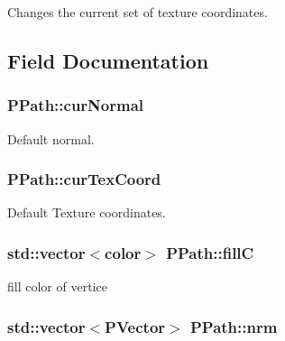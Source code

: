\-Changes the current set of texture coordinates. 



\subsection{\-Field \-Documentation}
\hypertarget{structPPath_ad6cdebaac653dd51a50cde8ef566a42c}{
\subsubsection[{cur\-Normal}]{ {\bf \-P\-Path\-::cur\-Normal}}}\label{structPPath_ad6cdebaac653dd51a50cde8ef566a42c}


\-Default normal. 

\hypertarget{structPPath_a385b5413251b5ab55b5b8ff6da36b2c3}{
\subsubsection[{cur\-Tex\-Coord}]{ {\bf \-P\-Path\-::cur\-Tex\-Coord}}}\label{structPPath_a385b5413251b5ab55b5b8ff6da36b2c3}


\-Default \-Texture coordinates. 

\hypertarget{structPPath_a59d5f8999f43e0d1e439418f6f236d45}{
\subsubsection[{fill\-C}]{\setlength{\rightskip}{0pt plus 5cm}std\-::vector$<${\bf color}$>$ {\bf \-P\-Path\-::fill\-C}}}\label{structPPath_a59d5f8999f43e0d1e439418f6f236d45}


fill color of vertice 

\hypertarget{structPPath_af14a5a7b4b9fa1ff51107c044b2be149}{
\subsubsection[{nrm}]{\setlength{\rightskip}{0pt plus 5cm}std\-::vector$<${\bf \-P\-Vector}$>$ {\bf \-P\-Path\-::nrm}}}\label{structPPath_af14a5a7b4b9fa1ff51107c044b2be149}


